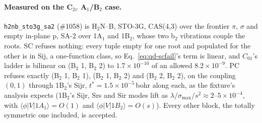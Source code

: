 \documentclass[11pt]{article}
\newcommand{\code}[1]{\texttt{#1}}
\begin{document}
\paragraph{Measured on the C$_{2v}$ A$_1$/B$_2$ case.}
\code{h2nb\_sto3g\_sa2} (\#1058) is H$_2$N--B, STO-3G, CAS(4,3) over the
frontier $\pi$, $\sigma$ and empty in-plane p, SA-2 over 1A$_1$ and 1B$_2$,
whose two b$_2$ vibrations couple the roots. SC refuses nothing: every
tuple empty for one root and populated for the other is in Sij, a
one-function class, so Eq.~\eqref{eq:qd-scfail}'s term is linear, and
$C_{01}$'s ladder is bilinear on (B$_2$ 1, B$_2$ 2) to $1.7\times10^{-10}$ of
an allowed $8.2\times10^{-9}$. PC refuses exactly (B$_2$ 1, B$_2$ 1),
(B$_2$ 1, B$_2$ 2) and (B$_2$ 2, B$_2$ 2), on the coupling $(0, 1)$ through
1B$_2$'s Sijr, $t^* = 1.5\times10^{-5}$\,bohr along each, as the fixture's
analysis expects (1B$_2$'s Sijr, Srs and Sir modes lift as $\lambda/
\sigma_{\max}/s^2 \approx 2$--$5\times10^{-4}$, with $\langle\phi|V|1A_1\rangle
= O(1)$ and $\langle\phi|V|1B_2\rangle = O(s)$). Every other block, the
totally symmetric one included, is accepted.
\end{document}
